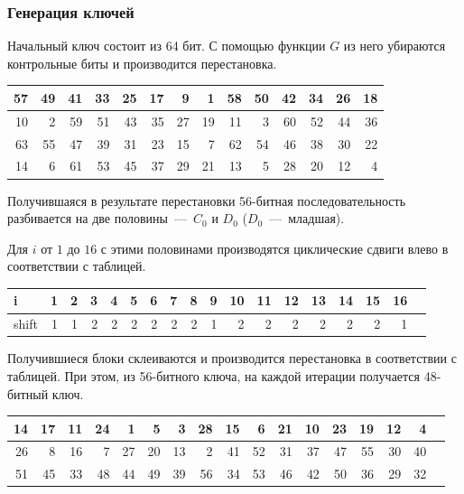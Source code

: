 \subsubsection{Генерация ключей}
Начальный ключ состоит из 64 бит. С помощью функции $G$ из него убираются контрольные биты и производится перестановка.

\begin{center}
\begin{tabular}{|r|r|r|r|r|r|r|r|r|r|r|r|r|r|} 
 \hline
57 & 49 & 41 & 33 & 25 & 17 & 9 & 1 & 58 & 50 & 42 & 34 & 26 & 18 \\ \hline
10 & 2 & 59 & 51 & 43 & 35 & 27 & 19 & 11 & 3 & 60 & 52 & 44 & 36 \\ \hline
63 & 55 & 47 & 39 & 31 & 23 & 15 & 7 & 62 & 54 & 46 & 38 & 30 & 22 \\ \hline
14 & 6 & 61 & 53 & 45 & 37 & 29 & 21 & 13 & 5 & 28 & 20 & 12 & 4 \\ \hline
\end{tabular}
\end{center}

Получившаяся в результате перестановки 56-битная последовательность разбивается на две половины~---~$C_0$ и $D_0$ ($D_0$~---~младшая).

Для $i$ от $1$ до $16$ с этими половинами производятся циклические сдвиги влево в соответствии с таблицей.

\begin{center}
\begin{tabular}{|l|r|r|r|r|r|r|r|r|r|r|r|r|r|r|r|r|r|} 
 \hline
i & 1 & 2 & 3 & 4 & 5 & 6 & 7 & 8 & 9 & 10 & 11 & 12 & 13 & 14 & 15 & 16 \\ \hline
shift & 1 & 1 & 2 & 2 & 2 & 2 & 2 & 2 & 1 & 2 & 2 & 2 & 2 & 2 & 2 & 1 \\ \hline
\end{tabular}
\end{center}

Получившиеся блоки склеиваются и производится перестановка в соответствии с таблицей. При этом, из 56-битного ключа, на каждой итерации получается 48-битный ключ.

\begin{center}
\begin{tabular}{|r|r|r|r|r|r|r|r|r|r|r|r|r|r|r|r|r|} 
 \hline
14 & 17 & 11 & 24 & 1 & 5 & 3 & 28 & 15 & 6 & 21 & 10 & 23 & 19 & 12 & 4 \\ \hline
26 & 8 & 16 & 7 & 27 & 20 & 13 & 2 & 41 & 52 & 31 & 37 & 47 & 55 & 30 & 40 \\ \hline
51 & 45 & 33 & 48 & 44 & 49 & 39 & 56 & 34 & 53 & 46 & 42 & 50 & 36 & 29 & 32  \\ \hline
\end{tabular}
\end{center}

